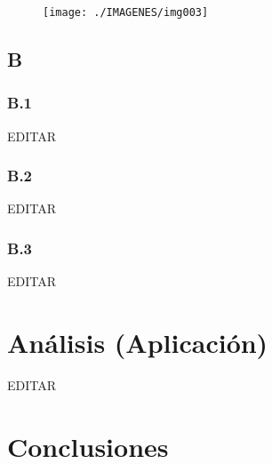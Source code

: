 \documentclass[preprint,12pt]{elsarticle}
\begin{document}
\begin{figure}[htb]
	\begin{center}
		\texttt{[image: ./IMAGENES/img003]} %
	\end{center}
\end{figure}



\subsection{\textbf{B}}

\subsubsection{\textbf{B.1}}

EDITAR

\subsubsection{\textbf{B.2}}	

EDITAR

\subsubsection{\textbf{B.3}}	

EDITAR





\section{Análisis (Aplicación)}

EDITAR




\section{Conclusiones}
\end{document}
